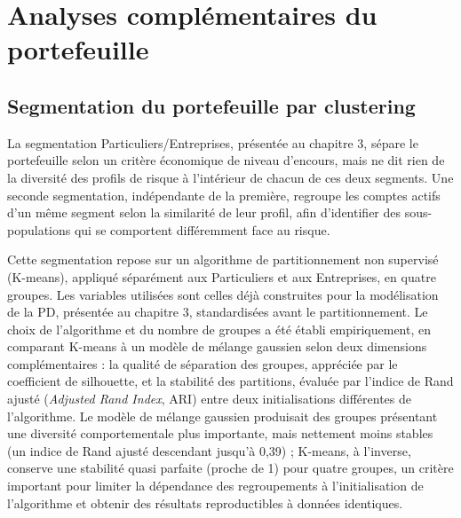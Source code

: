 \section{Analyses complémentaires du portefeuille}

\subsection{Segmentation du portefeuille par clustering}

La segmentation Particuliers/Entreprises, présentée au chapitre 3, sépare le portefeuille selon un critère économique de niveau d'encours, mais ne dit rien de la diversité des profils de risque à l'intérieur de chacun de ces deux segments. Une seconde segmentation, indépendante de la première, regroupe les comptes actifs d'un même segment selon la similarité de leur profil, afin d'identifier des sous-populations qui se comportent différemment face au risque.

Cette segmentation repose sur un algorithme de partitionnement non supervisé (K-means), appliqué séparément aux Particuliers et aux Entreprises, en quatre groupes. Les variables utilisées sont celles déjà construites pour la modélisation de la PD, présentée au chapitre 3, standardisées avant le partitionnement. Le choix de l'algorithme et du nombre de groupes a été établi empiriquement, en comparant K-means à un modèle de mélange gaussien selon deux dimensions complémentaires : la qualité de séparation des groupes, appréciée par le coefficient de silhouette, et la stabilité des partitions, évaluée par l'indice de Rand ajusté (\emph{Adjusted Rand Index}, ARI) entre deux initialisations différentes de l'algorithme. Le modèle de mélange gaussien produisait des groupes présentant une diversité comportementale plus importante, mais nettement moins stables (un indice de Rand ajusté descendant jusqu'à 0,39) ; K-means, à l'inverse, conserve une stabilité quasi parfaite (proche de 1) pour quatre groupes, un critère important pour limiter la dépendance des regroupements à l'initialisation de l'algorithme et obtenir des résultats reproductibles à données identiques.


